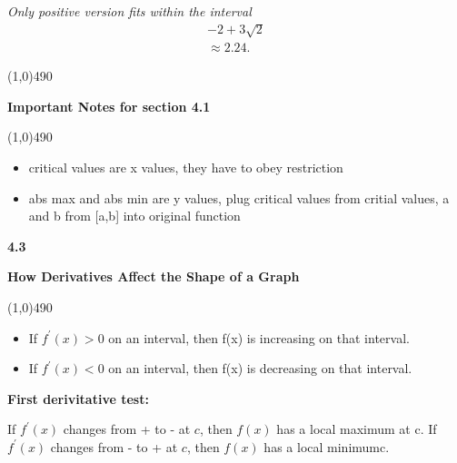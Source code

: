 \documentclass{report}
\begin{document}
   \bigbreak \noindent 
   \textit{Only positive version fits within the interval }
   \begin{align*}
     -2+3\sqrt{2} \\
     \approx 2.24
   .\end{align*}


   \bigbreak \noindent  \bigbreak \noindent \bigbreak \noindent 
   \line(1,0){490}
   \bigbreak \noindent 
   \begin{center}
     \begin{Large}
       \textbf{Important Notes for section 4.1}
     \end{Large}
   \end{center}
   \line(1,0){490}
   \bigbreak \noindent 
   \begin{itemize}
     \item critical values are x values, they have to obey restriction
      \item abs max and abs min are y values, plug critical values from critial values, a and b from [a,b] into original function
   \end{itemize}

   \pagebreak \bigbreak \noindent
   \begin{Large}
       \begin{mdframed}
           \begin{center}
               \textbf{4.3}
           \end{center}
       \end{mdframed}
   \end{Large}
   \begin{Large}
       \begin{center}
           \textbf{How Derivatives Affect the Shape of a Graph}
       \end{center}
   \end{Large}
   \line(1,0){490}
   
   \bigbreak \noindent \bigbreak \noindent \bigbreak \noindent 
   \begin{itemize}
     \item If $f^{\prime}(x) > 0$ on an interval, then f(x) is increasing on that interval.
     \item If $f^{\prime}(x) < 0$ on an interval, then f(x) is decreasing on that interval.
   \end{itemize}

   \bigbreak \noindent 
   \begin{mdframed}
     \begin{center}
       \textbf{First derivitative test:}
     \end{center}
     \bigbreak \noindent 
     If $f^{\prime}(x)$ changes from + to - at $c$, then $f(x)$ has a local maximum at c.
     \bigbreak \noindent 
     If $f^{\prime}(x)$ changes from - to + at $c$, then $f(x)$ has a local minimumc.
   \end{mdframed}
\end{document}
